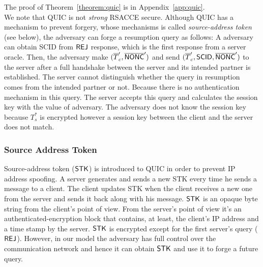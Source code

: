 The proof of Theorem~\ref{theorem:quic} is in Appendix~\ref{app:quic}.\\

We note that QUIC is not \textit{strong} RSACCE secure. Although QUIC has a mechanism to prevent forgery, whose mechanisms is called \textit{source-address token} (see below), the adversary can forge a resumption query as follows: A adversary can obtain SCID from $\mathsf{REJ}$ response, which is the first response from a server oracle. Then, the adversary make $(\overline{T}_c^{\prime}, \overline{\mathsf{NONC}}^{\prime})$ and send $(\overline{T}_c^{\prime}, \mathsf{SCID}, \overline{\mathsf{NONC}}^{\prime})$ to the server after a full handshake between the server and its intended partner is established. The server cannot distinguish whether the query in resumption comes from the intended partner or not. Because there is no authentication mechanism in this query. The server accepts this query and calculates the session key with the value of adversary. The adversary does not know the session key because $T_s^{\ast}$ is encrypted however a session key between the client and the server does not match.

\subsubsection{Source Address Token} \label{sec:source_address_token}
Source-address token ($\mathsf{STK}$) is introduced to QUIC in order to prevent IP address spoofing. A server generates and sends a new STK every time he sends a message to a client. The client updates STK when the client receives a new one from the server and sends it back along with his message. $\mathsf{STK}$ is an opaque byte string from the client's point of view. From the server's point of view it's an authenticated-encryption block that contains, at least, the client's IP address and a time stamp by the server. $\mathsf{STK}$ is encrypted except for the first server's query ($\mathsf{REJ}$). However, in our model the adversary has full control over the communication network and hence it can obtain $\mathsf{STK}$ and use it to forge a future query.